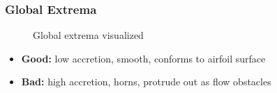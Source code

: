 \documentclass[9pt]{beamer}
\begin{document}
\begin{frame}
\frametitle{Global Extrema}
\label{sec-3-31}

\vspace*{-0.0cm}\begin{figure}
      \caption{Global extrema visualized}
\end{figure}
\begin{itemize}
\item \textbf{Good:} low accretion, smooth, conforms to airfoil surface
\item \textbf{Bad:} high accretion, horns, protrude out as flow obstacles
\end{itemize}
\end{frame}
\end{document}
